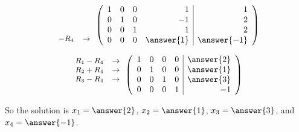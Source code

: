 \documentclass{ximera}
\begin{document}
\begin{exercise}
\begin{prompt}
\[
{\small
\begin{array}{lr}
  &    \\  
  &   \\
  &   \\
-R_4  & \rightarrow \\  
\end{array}
}
\left(\begin{array}{rrrr|r}
     1 &  0 &  0 &   1 &  1 \\
     0 &  1 &  0 &   -1 &  2 \\
     0 &  0 &  1 &   1 &  2 \\
     0 &  0 &  0 &   \answer{1} & \answer{-1} 
\end{array}\right)
\]

\[
{\small
\begin{array}{lr}
R_1-R_4  & \rightarrow   \\  
R_2+R_4  & \rightarrow  \\
R_3-R_4  & \rightarrow  \\
    &  \\  
\end{array}
}
\left(\begin{array}{rrrr|r}
     1 &  0 &  0 &   0 &  \answer{2} \\
     0 &  1 &  0 &   0 &  \answer{1} \\
     0 &  0 &  1 &   0 &  \answer{3} \\
     0 &  0 &  0 &   1 & -1 
\end{array}\right)
\]

So the solution is 
$x_1=\answer{2}$, 
$x_2=\answer{1}$,
$x_3=\answer{3}$, and
$x_4=\answer{-1}$. 

\end{prompt}

\end{exercise}

%
\end{document}
